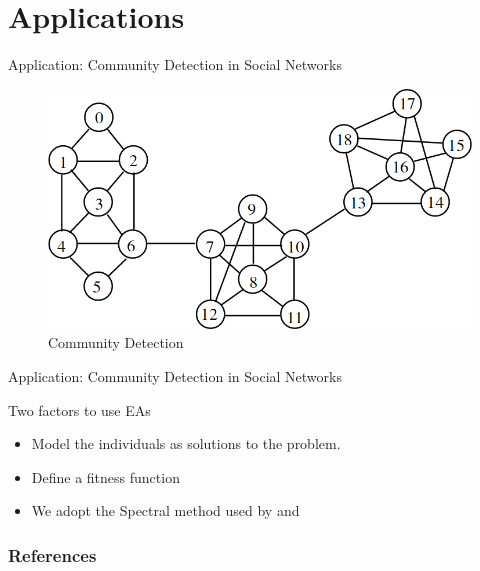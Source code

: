\documentclass[table]{beamer}
\begin{document}
	\section{Applications}
	\begin{frame}{Application: Community Detection in Social Networks}
		\begin{figure}[v]
			\includegraphics[scale=0.43]{comm_detect}
			\centering
			\caption{Community Detection}
			\label{ref:comm_detect}
		\end{figure}		
	\end{frame}
	
	\begin{frame}{Application: Community Detection in Social Networks}
		\begin{block}{Two factors to use EAs}
			\begin{itemize}
				\item Model the individuals as solutions to the problem.
				\item Define a fitness function
			\end{itemize}
		\end{block}
		\begin{block}{}
			\begin{itemize}
				\item We adopt the Spectral method used by \cite{shi2009pso} and \cite{capocci2005detecting}
			\end{itemize}
		\end{block}
	\end{frame}
	
	\begin{frame}[allowframebreaks]
		\frametitle{References}
		\fontsize{6pt}{3pt}
		
		
	\end{frame}
	
\end{document}
